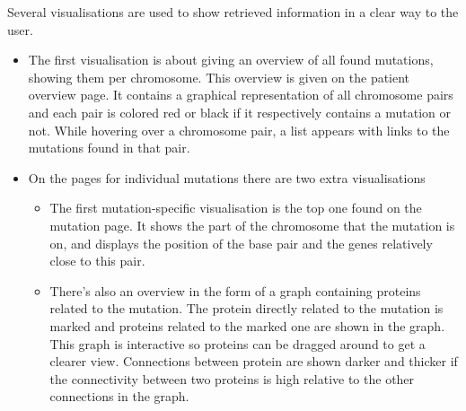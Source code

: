 Several visualisations are used to show retrieved information in a clear way to the user.

\begin{itemize}
  \item The first visualisation is about giving an overview of all found mutations, showing them per chromosome. This overview is given on the patient overview page. It contains a graphical representation of all chromosome pairs and each pair is colored red or black if it respectively contains a mutation or not. While hovering over a chromosome pair, a list appears with links to the mutations found in that pair.
  \item On the pages for individual mutations there are two extra visualisations
  \begin{itemize}
     \item The first mutation-specific visualisation is the top one found on the mutation page. It shows the part of the chromosome that the mutation is on, and displays the position of the base pair and the genes relatively close to this pair.
     \item There's also an overview in the form of a graph containing proteins related to the mutation. The protein directly related to the mutation is marked and proteins related to the marked one are shown in the graph. This graph is interactive so proteins can be dragged around to get a clearer view. Connections between protein are shown darker and thicker if the connectivity between two proteins is high relative to the other connections in the graph.
  \end{itemize}
\end{itemize}